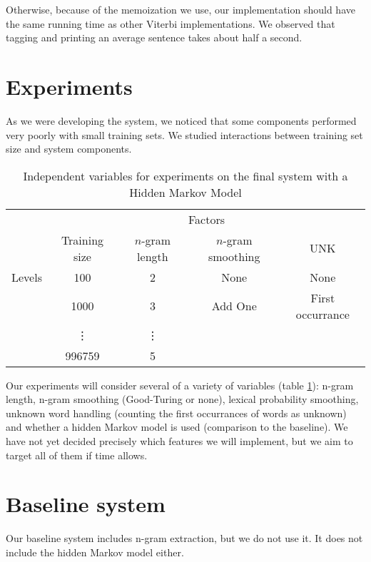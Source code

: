 \documentclass{article}
\begin{document}
Otherwise, because of the memoization we use, our implementation should have the
same running time as other Viterbi implementations.  We observed that tagging
and printing an average sentence takes about half a second.

\section{Experiments}
As we were developing the system, we noticed that some components performed
very poorly with small training sets. 
We studied interactions between training set size and system components.

\begin{table}
\begin{tabular}{lcccc}
& \multicolumn{4}{c}{Factors} \\
\cmidrule{2-5}
       & Training size & $n$-gram length & $n$-gram smoothing & UNK\\
\cmidrule{2-5}
Levels & 100     &  2  & None    & None \\
       & 1000    &  3  & Add One & First occurrance  \\
       & \vdots  &  \vdots  &     &      &      \\
       & 996759  &  5  &     &      &      \\
\cmidrule{2-5}
\end{tabular}
\caption{\label{tab:ind_vars}Independent variables for experiments on the final system with a Hidden Markov Model}
\end{table}

Our experiments will consider several of a variety of variables (table \ref{tab:ind_vars}): n-gram length,
n-gram smoothing (Good-Turing or none), lexical probability smoothing, unknown
word handling (counting the first occurrances of words as unknown) and
whether a hidden Markov model is used (comparison to the baseline).
We have not yet decided precisely which features we will implement, but we
aim to target all of them if time allows.

\section{Baseline system}
Our baseline system includes n-gram extraction,
but we do not use it.
It does not include the hidden Markov model either.
\end{document}

